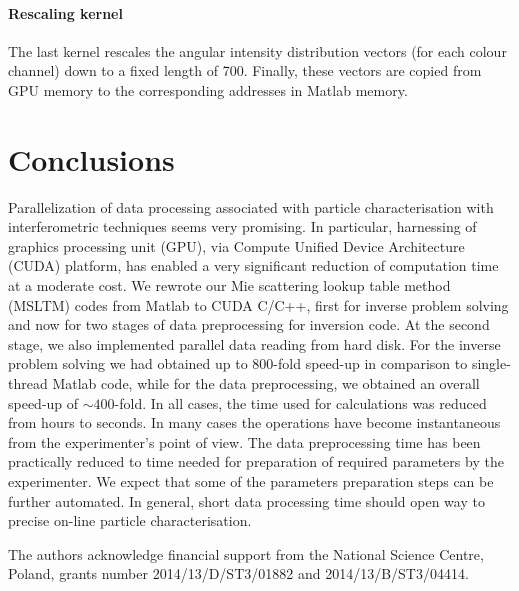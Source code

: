 \documentclass[preprint,review,12pt,dvips]{elsarticle}
\begin{document}
\paragraph{Rescaling kernel} The last kernel rescales the angular intensity distribution vectors (for each colour channel)
down to a fixed length of 700. Finally, these vectors are copied from GPU memory to the corresponding addresses in Matlab
memory.
\section{Conclusions}
Parallelization of data processing associated with particle characterisation with interferometric techniques seems very
promising. In particular, harnessing of graphics processing unit (GPU), via Compute Unified Device Architecture (CUDA)
platform, has enabled a very significant reduction of computation time at a moderate cost. We rewrote our Mie scattering
lookup table method (MSLTM) codes from Matlab to CUDA C/C++, first for inverse problem solving \cite{Smigacz} and now for
two stages of data preprocessing for inversion code. At the second stage, we also implemented parallel data reading from
hard disk. For the inverse problem solving we had obtained up to 800-fold speed-up in comparison to single-thread Matlab
code, while for the data preprocessing, we obtained an overall speed-up of $\sim 400$-fold. In all cases, the time used
for calculations was reduced from hours to seconds. In many cases the operations have become instantaneous from the
experimenter's point of view. The data preprocessing time has been practically reduced to time needed for preparation of
required parameters by the experimenter. We expect that some of the parameters preparation steps can be further automated.
In general, short data processing time should open way to precise on-line particle characterisation.

 The authors acknowledge financial support from the National Science Centre, Poland, grants
number 2014/13/D/ST3/01882 and 2014/13/B/ST3/04414.

%


\end{document}
